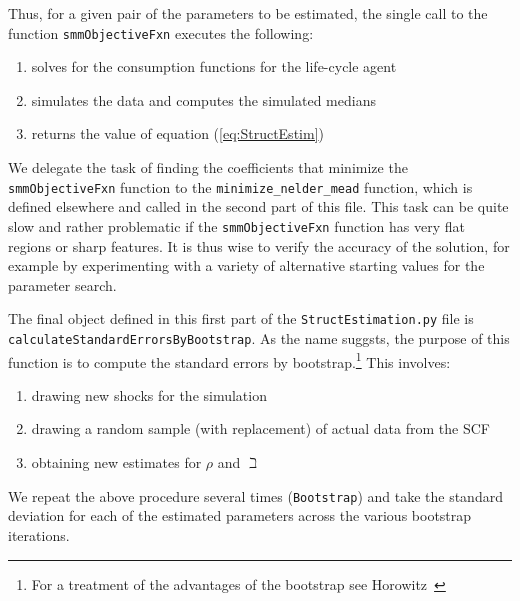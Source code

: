 \documentclass[titlepage, headings=optiontotocandhead]{Resources/texmf-local/tex/latex/econtex}
\begin{document}

Thus, for a given pair of the parameters to be estimated, the single
call to the function \texttt{smmObjectiveFxn} executes the following:
\begin{enumerate}
\item solves for the consumption functions for the life-cycle agent
\item simulates the data and computes the simulated medians
\item returns the value of equation (\ref{eq:StructEstim})
\end{enumerate}

We delegate the task of finding the coefficients that minimize the \texttt{smmObjectiveFxn} function to the \texttt{minimize\_nelder\_mead} function, which is defined elsewhere and called in the second part of this file.  This task can be quite slow and rather problematic if the \texttt{smmObjectiveFxn} function has very flat regions or sharp features. It is thus wise to verify the accuracy of the solution, for example by experimenting with a variety of alternative starting values for the parameter search.

The final object defined in this first part of the \texttt{StructEstimation.py}
file is \texttt{calculateStandardErrorsByBootstrap}. As the name suggsts, the
purpose of this function is to compute the standard errors by bootstrap.\footnote{For a
  treatment of the advantages of the bootstrap see
  Horowitz~\citeyearpar{horowitzBootstrap}} This involves:
\begin{enumerate}
\item drawing new shocks for the simulation
\item drawing a random sample (with replacement) of actual data from the SCF
\item obtaining new estimates for $\rho$ and $\beth$
\end{enumerate}
We repeat the above procedure several times (\texttt{Bootstrap}) and
take the standard deviation for each of the estimated parameters across the various bootstrap iterations.
\end{document}
